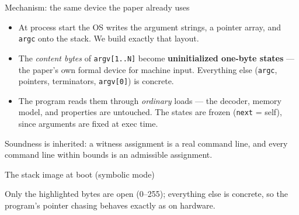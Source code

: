 \documentclass[aspectratio=169]{beamer}
\newcommand{\lab}[1]{{\footnotesize\color{ink!65}#1}}
\newcommand{\key}[1]{\textbf{\color{accentdk}#1}}
\begin{document}
\begin{frame}{Mechanism: the same device the paper already uses}
  \begin{itemize}\setlength\itemsep{0.3em}\footnotesize
    \item At process start the OS writes the argument strings, a pointer
          array, and \texttt{argc} onto the stack. We build exactly that
          layout.
    \item The \emph{content bytes} of \texttt{argv[1..N]} become
          \key{uninitialized one-byte states} --- the paper's own formal
          device for machine input. Everything else (\texttt{argc}, pointers,
          terminators, \texttt{argv[0]}) is concrete.
    \item The program reads them through \emph{ordinary} loads --- the decoder,
          memory model, and properties are untouched. The states are frozen
          (\texttt{next} = self), since arguments are fixed at exec time.
  \end{itemize}
  \vfill
  \lab{Soundness is inherited: a witness assignment is a real command line,
       and every command line within bounds is an admissible assignment.}
\end{frame}

\begin{frame}{The stack image at boot (symbolic mode)}
  \centering
  \vfill
  \lab{Only the highlighted bytes are open (0--255); everything else is
       concrete, so the program's pointer chasing behaves exactly as on
       hardware.}
\end{frame}
\end{document}
